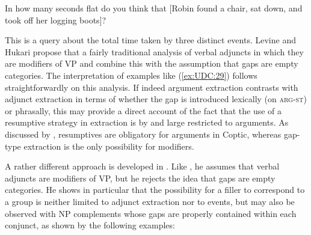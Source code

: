 \documentclass[output=paper
                ,modfonts
                ,nonflat
	        ,collection
	        ,collectionchapter
	        ,collectiontoclongg
 	        ,biblatex
                ,babelshorthands
                ,newtxmath
                ,draftmode
                ,colorlinks, citecolor=brown
]{./langsci/langscibook}
\begin{document}
{\begin{exe}
\ex \label{ex:UDC:29}
In how many seconds flat do you think that {[}Robin found a chair,
sat down, and took off her logging boots{]}?
\end{exe}

\noindent
This is a query about the total time taken by three distinct events.
Levine and Hukari propose that a fairly traditional analysis of verbal
adjuncts in which they are modifiers of VP and combine this with the
assumption that gaps are empty categories. The interpretation of
examples like (\ref{ex:UDC:29}) follows straightforwardly on this
analysis. If indeed argument extraction contrasts with adjunct
extraction in terms of whether the gap is introduced  lexically (on
\textsc{arg-st}) or phrasally, this may
provide a direct account of the fact that the use of a resumptive
strategy in extraction is by and large restricted to arguments. As
discussed by \citet{Crysmann:Reintges:14}, resumptives are obligatory
for arguments in Coptic, whereas gap-type extraction is the only
possibility for modifiers.
 

A rather different approach is developed in \citet{Chaves:09}. Like
\citet{Levine:Hukari:06}, he assumes that verbal adjuncts are
modifiers of VP, but he rejects the idea that gaps are empty
categories. He shows in particular that the possibility for a filler
to correspond to a group is neither limited to adjunct extraction nor
to events, but may also be observed with NP complements whose gaps are
properly contained within each conjunct, as shown by the following
examples: 

\begin{exe} \ex \begin{xlist} \label{ex:UDC:31}


\end{xlist}
\end{exe}


}
\end{document}
